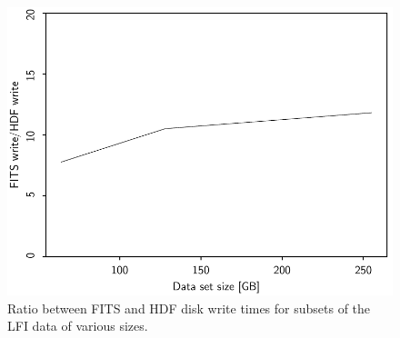 \documentclass[twocolumn]{aa}
\begin{document}
\begin{figure}[t]
  \center
  \includegraphics[width=\linewidth]{figs/hdfVfits.pdf}
  \caption{Ratio between FITS and HDF disk write times for subsets of
    the LFI data of various sizes. 
  }\label{fig:hdfVfits}
\end{figure}
\end{document}
